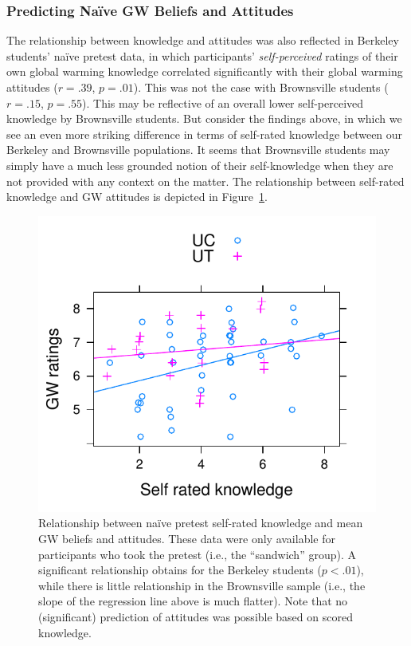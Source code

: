 \subsubsection{Predicting Na\"ive GW Beliefs and Attitudes}

The relationship between knowledge and attitudes was also reflected in Berkeley
students’ naïve pretest data, in which participants’ \emph{self-perceived} ratings of
their own global warming knowledge correlated significantly with their global
warming attitudes ($r = .39$, $p = .01$). This was not the case with
Brownsville students ($r = .15$, $p = .55$). This may be reflective of an overall
lower self-perceived knowledge by Brownsville students. But consider the
findings above, in which we see an even more striking difference in terms of
self-rated knowledge between our Berkeley and Brownsville populations. It seems
that Brownsville students may simply have a much less grounded notion of their
self-knowledge when they are not provided with any context on the matter. The
relationship between self-rated knowledge and GW attitudes is depicted in
Figure~\ref{fig:class-predicting-gw}.

\begin{figure}
    \centering
    \includegraphics{class-predicting-gw.pdf}
    \caption{Relationship between na\"ive pretest self-rated knowledge and mean
        GW beliefs and attitudes. These data were only available for
        participants who took the pretest (i.e., the “sandwich” group). A
        significant relationship obtains for the Berkeley students ($p < .01$),
        while there is little relationship in the Brownsville sample (i.e., the
        slope of the regression line above is much flatter). Note that no
        (significant) prediction of attitudes was possible based on scored
        knowledge.}
    \label{fig:class-predicting-gw}
\end{figure}

